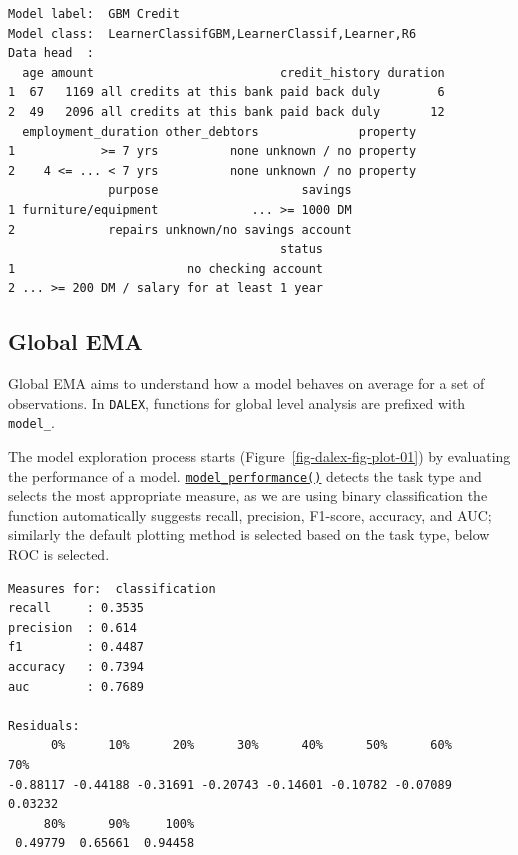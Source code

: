 \begin{verbatim}
Model label:  GBM Credit 
Model class:  LearnerClassifGBM,LearnerClassif,Learner,R6 
Data head  :
  age amount                          credit_history duration
1  67   1169 all credits at this bank paid back duly        6
2  49   2096 all credits at this bank paid back duly       12
  employment_duration other_debtors              property
1            >= 7 yrs          none unknown / no property
2    4 <= ... < 7 yrs          none unknown / no property
              purpose                    savings
1 furniture/equipment             ... >= 1000 DM
2             repairs unknown/no savings account
                                      status
1                        no checking account
2 ... >= 200 DM / salary for at least 1 year
\end{verbatim}

\hypertarget{sec-interpretability-dataset-level}{%
\subsection{Global EMA}\label{sec-interpretability-dataset-level}}

Global EMA aims to understand how a model behaves on average for a set
of observations. In \texttt{DALEX}, functions for global level analysis
are prefixed with \texttt{model\_}.

The model exploration process starts
(Figure~\ref{fig-dalex-fig-plot-01}) by evaluating the performance of a
model.
\href{https://www.rdocumentation.org/packages/DALEX/topics/model_performance}{\texttt{model\_performance()}}
detects the task type and selects the most appropriate measure, as we
are using binary classification the function automatically suggests
recall, precision, F1-score, accuracy, and AUC; similarly the default
plotting method is selected based on the task type, below ROC is
selected.

\begin{Shaded}
\begin{Highlighting}[]
\OtherTok{=} 
\end{Highlighting}
\end{Shaded}

\begin{verbatim}
Measures for:  classification
recall     : 0.3535 
precision  : 0.614 
f1         : 0.4487 
accuracy   : 0.7394 
auc        : 0.7689

Residuals:
      0%      10%      20%      30%      40%      50%      60%      70% 
-0.88117 -0.44188 -0.31691 -0.20743 -0.14601 -0.10782 -0.07089  0.03232 
     80%      90%     100% 
 0.49779  0.65661  0.94458 
\end{verbatim}

